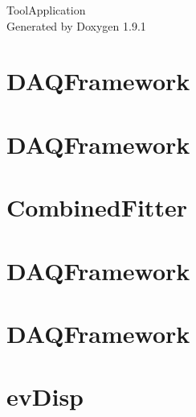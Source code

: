 \let\mypdfximage\pdfximage\def\pdfximage{\immediate\mypdfximage}\documentclass[twoside]{book}
\newcommand{\+}{\discretionary{\mbox{\scriptsize$\hookleftarrow$}}{}{}}
\newcommand{\clearemptydoublepage}{%
  \newpage{\pagestyle{empty}\cleardoublepage}%
}
\begin{document}
\raggedbottom

\hypersetup{pageanchor=false,
             bookmarksnumbered=true,
             pdfencoding=unicode
            }
\begin{titlepage}
\vspace*{7cm}
\begin{center}%
{\Large Tool\+Application }\\
\vspace*{1cm}
{\large Generated by Doxygen 1.9.1}\\
\end{center}
\end{titlepage}
\clearemptydoublepage
{}
\tableofcontents
\clearemptydoublepage
{}
\hypersetup{pageanchor=true}

\chapter{DAQFramework}
\label{md_UserTools_AddTree_README}

\chapter{DAQFramework}
\label{md_UserTools_BuildHist_README}

\chapter{Combined\+Fitter}
\label{md_UserTools_CombinedFitter_README}

\chapter{DAQFramework}
\label{md_UserTools_CompareRootFiles_README}

\chapter{DAQFramework}
\label{md_UserTools_CutRecorder_README}

\chapter{ev\+Disp}
\label{md_UserTools_evDisp_README}

\end{document}
